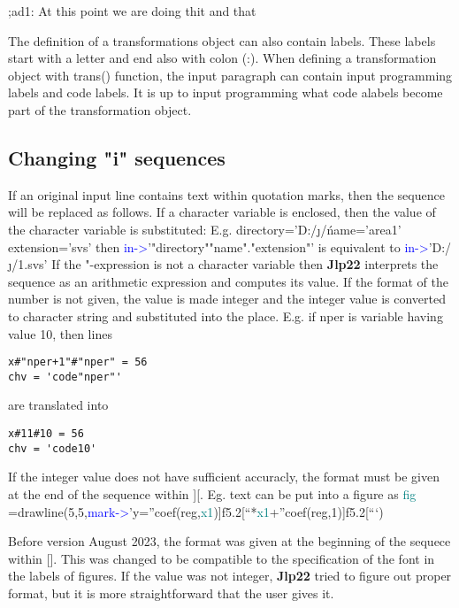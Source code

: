 ;ad1:  At this point we are doing thit and that 
 
 
\begin{note} 
The definition of a transformations object can also contain labels. These labels start 
with a letter and end also with colon (:). When defining a transformation object with \textcolor{VioletRed}{trans}() function, 
the input paragraph can contain input programming labels and code labels. It is up to 
input programming what code alabels become part of the transformation object. 
\end{note} 
 
 
\subsection{Changing "i" sequences} 
\label{inpureplace} 
If an original input line contains text within quotation marks, then the sequence will be replaced 
as follows. If a character variable is enclosed, then the value of the character variable is 
substituted: E.g. 
directory='D:/\j/\' 
name='area1' 
extension='svs' 
then 
\textcolor{blue}{in->}'"directory""name"."extension"' 
is equivalent to 
\textcolor{blue}{in->}'D:/\j/\area1.svs' 
If the "-expression is not a character variable then \textbf{Jlp22} interprets the sequence as an arithmetic 
expression and computes its value. If the format of the number is not given, 
the value is made integer and the integer value is converted to character string and 
substituted into the place. E.g. if nper is variable having value 10, then lines 
\color{Green} 
\begin{verbatim} 
x#"nper+1"#"nper" = 56 
chv = 'code"nper"' 
\end{verbatim} 
\color{Black} 
are translated into 
\color{Green} 
\begin{verbatim} 
x#11#10 = 56 
chv = 'code10' 
\end{verbatim} 
\color{Black} 
 
If the integer value does not have sufficient accuracly, the format must be given at the end 
of the sequence within ][. 
Eg. text can be put into a figure as 
\textcolor{teal}{fig} =\textcolor{VioletRed}{drawline}(5,5,\textcolor{blue}{mark->}’y=”coef(reg,\textcolor{teal}{x1})]f5.2[“*\textcolor{teal}{x1}+”coef(reg,1)]f5.2[“‘) 
\begin{note} 
Before version August 2023, the format was given at the beginning of the sequece 
within []. This was changed to be compatible to the specification of the font in the labels 
of figures. If the value was not integer, \textbf{Jlp22} tried to figure out proper format, but 
it is more straightforward that the user gives it. 
\end{note} 
